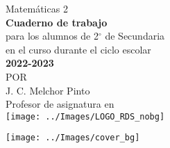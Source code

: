 % 
\thispagestyle{empty}
\begin{center}
    \vspace{4cm}
    {\Huge Matem\'aticas 2}\\
    \vspace{1cm}
    \normalsize
    \textbf{\large Cuaderno de trabajo}\\
    para los alumnos de 2$^\circ$ de  Secundaria\\
    en el curso durante el ciclo escolar\\
    \textbf{2022-2023}\\
    \vspace{2cm}
    \small POR\\
    \Large J. C. Melchor Pinto\\[0.5em]
    \normalsize Profesor de asignatura en\\
    \vspace{2cm}
    \texttt{[image: ../Images/LOGO\_RDS\_nobg]}\\
    \vspace{1cm}
\end{center}
%
\texttt{[image: ../Images/cover\_bg]}
% 